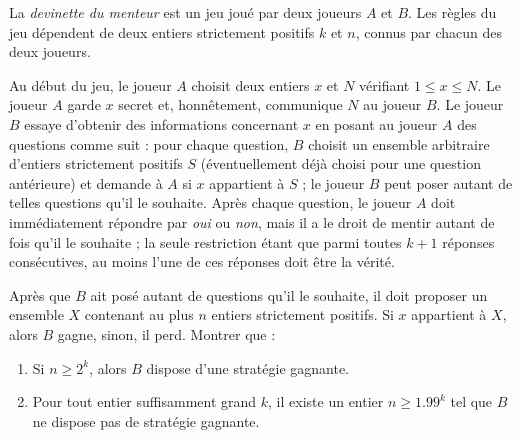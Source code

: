 La \emph{devinette du menteur} est un jeu joué par deux joueurs $A$ et $B$. Les règles du jeu dépendent de
deux entiers strictement positifs $k$ et $n$, connus par chacun des deux joueurs.

Au début du jeu, le joueur $A$ choisit deux entiers $x$ et $N$ vérifiant $1 \leq x \leq N$. Le joueur $A$
garde $x$ secret et, honnêtement, communique $N$ au joueur $B$. Le joueur $B$ essaye d'obtenir des
informations concernant $x$ en posant au joueur $A$ des questions comme suit : pour chaque question, $B$
choisit un ensemble arbitraire d'entiers strictement positifs $S$ (éventuellement déjà choisi pour une
question antérieure) et demande à $A$ si $x$ appartient à $S$ ; le joueur $B$ peut poser autant de telles
questions qu'il le souhaite. Après chaque question, le joueur $A$ doit immédiatement répondre par \emph{oui}
ou \emph{non}, mais il a le droit de mentir autant de fois qu'il le souhaite ; la seule restriction étant que
parmi toutes $k + 1$ réponses consécutives, au moins l'une de ces réponses doit être la vérité.

Après que $B$ ait posé autant de questions qu'il le souhaite, il doit proposer un ensemble $X$ contenant au
plus $n$ entiers strictement positifs. Si $x$ appartient à $X$, alors $B$ gagne, sinon, il perd. Montrer que :
\begin{enumerate}
  \item Si $n \geq 2^k$, alors $B$ dispose d'une stratégie gagnante.
  \item Pour tout entier suffisamment grand $k$, il existe un entier $n \geq 1.99^k$ tel que $B$ ne dispose
  pas de stratégie gagnante.
\end{enumerate}
